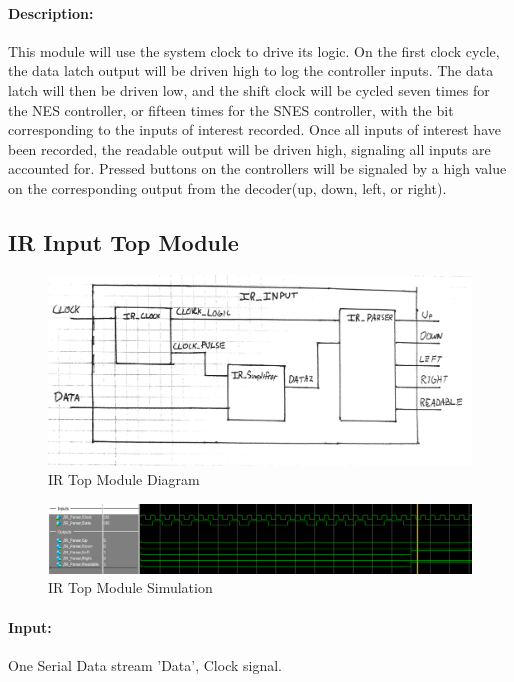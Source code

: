 \documentclass[]{article}
\begin{document}
\paragraph{Description:} This module will use the system clock to drive its logic. On the first clock cycle,
the data latch output will be driven high to log the controller inputs. The data latch will then be driven low,
and the shift clock will be cycled seven times for the NES controller, or fifteen times for the SNES controller,
with the bit corresponding to the inputs of interest recorded. Once all inputs of interest have been recorded,
the readable output will be driven high, signaling all inputs are accounted for.
Pressed buttons on the controllers will be signaled by a high value on the corresponding output from the decoder(up, down, left, or right). 

\subsection{IR Input Top Module}
\begin{figure}[H]\centering
    \includegraphics[width=\linewidth]{figures/IR_Input_Block.jpg}
    \caption{IR Top Module Diagram}
    \label{fig:irInputDecoderBlock}
\end{figure}
\begin{figure}[H]\centering
    \includegraphics[width=\linewidth]{figures/IR_Input_Sim.PNG}
    \caption{IR Top Module Simulation}
    \label{fig:irInputDecoderSim}
\end{figure}
\paragraph{Input:} One Serial Data stream 'Data', Clock signal.
\end{document}
